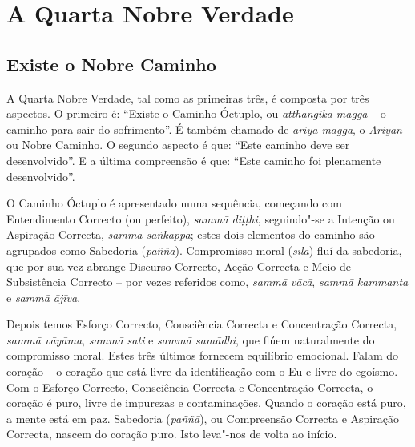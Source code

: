 
\chapter{A Quarta Nobre Verdade}

\pagestyle{topbottomcorner}

\section{Existe o Nobre Caminho}

A Quarta Nobre Verdade, tal como as primeiras três, é composta por três aspectos.
O primeiro é: “Existe o Caminho Óctuplo, ou \emph{atthangika magga} – o caminho
para sair do sofrimento”. É também chamado de \emph{ariya magga}, o
\emph{Ariyan} ou Nobre Caminho. O segundo aspecto é que: “Este caminho deve ser
desenvolvido”. E a última compreensão é que: “Este caminho foi plenamente desenvolvido”.

O Caminho Óctuplo é apresentado numa sequência, começando com Entendimento
Correcto (ou perfeito), \emph{sammā diṭṭhi}, seguindo"-se a Intenção ou Aspiração
Correcta, \emph{sammā saṅkappa}; estes dois elementos do caminho são agrupados
como Sabedoria (\emph{paññā}). Compromisso moral (\emph{sīla}) fluí da
sabedoria, que por sua vez abrange Discurso Correcto, Acção Correcta e Meio de
Subsistência Correcto – por vezes referidos como, \emph{sammā vācā}, \emph{sammā
  kammanta} e \emph{sammā ājīva}.

Depois temos Esforço Correcto, Consciência Correcta e Concentração Correcta,
\emph{sammā vāyāma}, \emph{sammā sati} e \emph{sammā samādhi}, que flúem
naturalmente do compromisso moral. Estes três últimos fornecem equilíbrio
emocional. Falam do coração – o coração que está livre da identificação com o Eu
e livre do egoísmo. Com o Esforço Correcto, Consciência Correcta e Concentração
Correcta, o coração é puro, livre de impurezas e contaminações. Quando o coração
está puro, a mente está em paz. Sabedoria (\emph{paññā}), ou Compreensão
Correcta e Aspiração Correcta, nascem do coração puro. Isto leva"-nos de volta ao
início.

